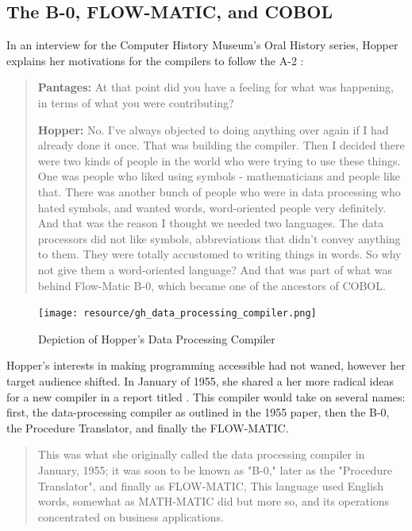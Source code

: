 \subsection{The B-0, FLOW-MATIC, and COBOL}

In an interview for the Computer History Museum's Oral History series,
Hopper explains her motivations for the compilers to follow the A-2
\cite{Hopper_1980_Oral_History}:

\begin{quotation}
	\textbf{Pantages:} At that point did you have a feeling for what was
	happening, in terms of what you were contributing?

	\textbf{Hopper:} No. I've always objected to doing anything over again if I had
	already done it once. That was building the compiler. Then I decided there were
	two kinds of people in the world who were trying to use these things. One was
	people who liked using symbols - mathematicians and people like that. There was
	another bunch of people who were in data processing who hated symbols, and
	wanted words, word-oriented people very definitely. And that was the reason I
	thought we needed two languages.  The data processors did not like symbols,
	abbreviations that didn't convey anything to them.  They were totally
	accustomed to writing things in words. So why not give them a word-oriented
	language? And that was part of what was behind Flow-Matic B-0, which became one
	of the ancestors of COBOL.
\end{quotation}

\begin{figure}
	\centering
	\texttt{[image: resource/gh\_data\_processing\_compiler.png]}
	\caption{Depiction of Hopper's Data Processing Compiler\cite{hopper_1955_preliminary_definitions_data_processing_compiler}}
	\label{fig:data-processing-compiler}
\end{figure}

Hopper's interests in making programming accessible had not waned,
however her target audience shifted.
In January of 1955, she shared a her more radical ideas for a new
compiler in a report titled
\cite{hopper_1955_preliminary_definitions_data_processing_compiler}
.
This compiler would take on several names: first, the data-processing
compiler as outlined in the 1955 paper, then the B-0, the Procedure Translator,
and finally the FLOW-MATIC.

\begin{quotation}
	This was what she originally called the data processing compiler in January,
	1955; it was soon to be known as "B-0," later as the "Procedure
	Translator", and finally as FLOW-MATIC, This language used English
	words, somewhat as MATH-MATIC did but more so, and its operations concentrated
	on business applications.
	\cite{history_of_computing_in_the_twentieth_century_1980}
\end{quotation}

